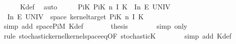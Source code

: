 \begin{isabellebody}
\ \ \ \ \isamarkupfalse%
\ K{\isacharunderscore}{\kern0pt}def\ \isamarkupfalse%
\ auto\isanewline
\ \ \isamarkupfalse%
\ \isamarkupfalse%
\ PiK{\isacharunderscore}{\kern0pt}{}{\isacharcolon}{\kern0pt}\ {\isachardoublequoteopen}{\isacharparenleft}{\kern0pt}PiK\ n\ I\ K{\isacharparenright}{\kern0pt}\ {}\ {\isacharparenleft}{\kern0pt}I{\isacharbackquote}{\kern0pt}{\isacharbraceleft}{\kern0pt}{}{\isachardot}{\kern0pt}{\isachardot}{\kern0pt}n{\isacharbraceright}{\kern0pt}\ {\isasymrightarrow}\isactrlsub E\ UNIV{\isacharparenright}{\kern0pt}\ {\isacharequal}{\kern0pt}\ {}{\isachardoublequoteclose}\isanewline
\ \ \isamarkupfalse%
\ {\isacharminus}{\kern0pt}\isanewline
\ \ \ \ \isamarkupfalse%
\ {}{\isacharcolon}{\kern0pt}\ {\isachardoublequoteopen}I{\isacharbackquote}{\kern0pt}{\isacharbraceleft}{\kern0pt}{}{\isachardot}{\kern0pt}{\isachardot}{\kern0pt}n{\isacharbraceright}{\kern0pt}\ {\isasymrightarrow}\isactrlsub E\ UNIV\ {\isacharequal}{\kern0pt}\ space\ {\isacharparenleft}{\kern0pt}kernel{\isacharunderscore}{\kern0pt}target\ {\isacharparenleft}{\kern0pt}PiK\ n\ I\ K{\isacharparenright}{\kern0pt}{\isacharparenright}{\kern0pt}\ {\isachardoublequoteclose}\isanewline
\ \ \ \ \ \ \isamarkupfalse%
\ {\isacharparenleft}{\kern0pt}simp\ add{\isacharcolon}{\kern0pt}\ space{\isacharunderscore}{\kern0pt}PiM\ K{\isacharunderscore}{\kern0pt}def{\isacharparenright}{\kern0pt}\isanewline
\ \ \ \ \isamarkupfalse%
\ \isamarkupfalse%
\ {\isacharquery}{\kern0pt}thesis\isanewline
\ \ \ \ \ \ \isamarkupfalse%
\ {\isacharparenleft}{\kern0pt}simp\ only{\isacharcolon}{\kern0pt}\ {}{\isacharparenright}{\kern0pt}\isanewline
\ \ \ \ \ \ \isamarkupfalse%
\ {\isacharparenleft}{\kern0pt}rule\ stochastic{\isacharunderscore}{\kern0pt}kernel{\isachardot}{\kern0pt}kernel{\isacharunderscore}{\kern0pt}space{\isacharunderscore}{\kern0pt}eq{\isacharunderscore}{\kern0pt}{}{\isacharbrackleft}{\kern0pt}OF\ stochastic{\isacharunderscore}{\kern0pt}K{\isacharbrackright}{\kern0pt}{\isacharparenright}{\kern0pt}\isanewline
\ \ \ \ \ \ \isamarkupfalse%
\ {\isacharparenleft}{\kern0pt}simp\ add{\isacharcolon}{\kern0pt}\ K{\isacharunderscore}{\kern0pt}def{\isacharparenright}{\kern0pt}\isanewline
\ \ \ \ \ \ \isamarkupfalse%
\isanewline
\ \ \isamarkupfalse%
\isanewline
\ \ \isamarkupfalse%
%
\endisatagproof
{\isafoldproof}%
%
\isadelimproof
%
\endisadelimproof
\isanewline
%
\isadelimtheory
\isanewline
%
\endisadelimtheory
%
\isatagtheory
{}\isamarkupfalse%
%
\endisatagtheory
{\isafoldtheory}%
%
\isadelimtheory
%
\endisadelimtheory
%
\end{isabellebody}%
